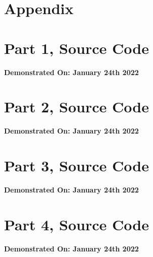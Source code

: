 
\section{Appendix}\label{sec:appendix}
\begin{appendix}

    \section{Part 1, Source Code}\label{sec:part1_source}
        \bigbreak
        {
            \selectfont\footnotesize
            
        }

        \textbf{Demonstrated On: January 24th 2022}

    \newpage
    \section{Part 2, Source Code}\label{sec:part2_source}
        \bigbreak
        {
            \selectfont\footnotesize
            
        }

        \textbf{Demonstrated On: January 24th 2022}

    \newpage
    \section{Part 3, Source Code}\label{sec:part3_source}
        \bigbreak
        {
            \selectfont\footnotesize
            
        }

        \textbf{Demonstrated On: January 24th 2022}

    \newpage
    \section{Part 4, Source Code}\label{sec:part4_source}
        \bigbreak
        {
            \selectfont\footnotesize
            
        }

        \textbf{Demonstrated On: January 24th 2022}

\end{appendix}
